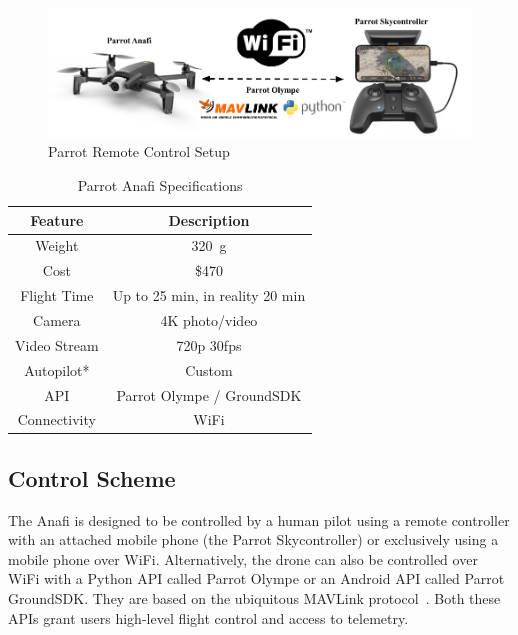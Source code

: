 \begin{figure}
    \centering
    \includegraphics[width=1.0\linewidth]{chapter3/FIGS/ctrl.png}
    \caption{Parrot Remote Control Setup~\cite{ParrotAnafi}}
    \label{fig:parrot-control-setup}
\end{figure}

\begin{table}[]
    \centering
    \begin{tabular}{|c|c|}
     \hline
     \textbf{Feature} & \textbf{Description}  \\
     \hline
     Weight & 320~g \\
     \hline
     Cost & \$470 \\
     \hline
     Flight Time & Up to 25 min, in reality 20 min \\
     \hline
     Camera & 4K photo/video \\
     \hline
     Video Stream & 720p 30fps \\
     \hline
     Autopilot* & Custom \\
     \hline
     API & Parrot Olympe / GroundSDK \\
     \hline
     Connectivity & WiFi \\
     \hline
    \end{tabular}
    \caption{Parrot Anafi Specifications}
    \label{tab:anafi-features}
\end{table}

\subsection{Control Scheme}
The Anafi is designed to be controlled by a human pilot using a remote controller with an attached mobile phone (the Parrot Skycontroller) or exclusively using a mobile phone over WiFi. Alternatively, the drone can also be controlled over WiFi with a Python API called Parrot Olympe or an Android API called Parrot GroundSDK. They are based on the ubiquitous MAVLink protocol~\cite{MAVLink}. Both these APIs grant users high-level flight control and access to telemetry.

